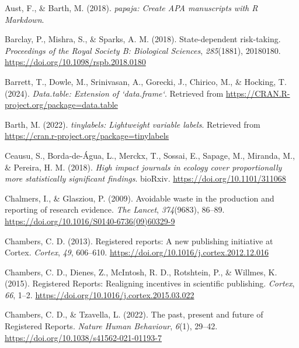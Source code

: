 \documentclass[
  ,man,mask,floatsintext]{apa6}
\newlength{\cslhangindent}
\newlength{\cslentryspacingunit} %
\newenvironment{CSLReferences}[2] %
 {%
  \setlength{\parindent}{0pt}
  \ifodd #1
  \let\oldpar\par
  \def\par{\hangindent=\cslhangindent\oldpar}
  \fi
  \setlength{\parskip}{#2\cslentryspacingunit}
 }%
 {}
\begin{document}
\begin{CSLReferences}{1}{0}
\leavevmode{}%
Aust, F., \& Barth, M. (2018). \emph{{papaja}: {Create APA} manuscripts with {R Markdown}}.

\leavevmode{}%
Barclay, P., Mishra, S., \& Sparks, A. M. (2018). State-dependent risk-taking. \emph{Proceedings of the Royal Society B: Biological Sciences}, \emph{285}(1881), 20180180. \url{https://doi.org/10.1098/rspb.2018.0180}

\leavevmode{}%
Barrett, T., Dowle, M., Srinivasan, A., Gorecki, J., Chirico, M., \& Hocking, T. (2024). \emph{Data.table: Extension of `data.frame`}. Retrieved from \url{https://CRAN.R-project.org/package=data.table}

\leavevmode{}%
Barth, M. (2022). \emph{{tinylabels}: Lightweight variable labels}. Retrieved from \url{https://cran.r-project.org/package=tinylabels}

\leavevmode{}%
Ceausu, S., Borda-de-Água, L., Merckx, T., Sossai, E., Sapage, M., Miranda, M., \& Pereira, H. M. (2018). \emph{High impact journals in ecology cover proportionally more statistically significant findings}. bioRxiv. \url{https://doi.org/10.1101/311068}

\leavevmode{}%
Chalmers, I., \& Glasziou, P. (2009). Avoidable waste in the production and reporting of research evidence. \emph{The Lancet}, \emph{374}(9683), 86--89. \url{https://doi.org/10.1016/S0140-6736(09)60329-9}

\leavevmode{}%
Chambers, C. D. (2013). Registered reports: {A} new publishing initiative at {Cortex}. \emph{Cortex}, \emph{49}, 606--610. \url{https://doi.org/10.1016/j.cortex.2012.12.016}

\leavevmode{}%
Chambers, C. D., Dienes, Z., McIntosh, R. D., Rotshtein, P., \& Willmes, K. (2015). Registered {Reports}: {Realigning} incentives in scientific publishing. \emph{Cortex}, \emph{66}, 1--2. \url{https://doi.org/10.1016/j.cortex.2015.03.022}

\leavevmode{}%
Chambers, C. D., \& Tzavella, L. (2022). The past, present and future of {Registered Reports}. \emph{Nature Human Behaviour}, \emph{6}(1), 29--42. \url{https://doi.org/10.1038/s41562-021-01193-7}


\end{CSLReferences}
\end{document}
